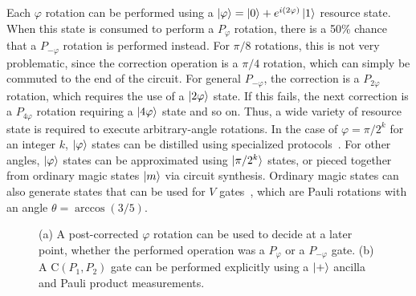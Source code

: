 \documentclass[prx,aps,letterpaper,twocolumn,allowfontchageintitle=true,accepted=2019-02-01]{quantumarticle}
\begin{document}
Each $\varphi$ rotation can be performed using a $\ket{\varphi} = \ket{0} + e^{i(2\varphi)}\ket{1}$ resource state. When this state is consumed to perform a $P_{\varphi}$ rotation, there is a 50\% chance that a $P_{-\varphi}$ rotation is performed instead. For $\pi/8$ rotations, this is not very problematic, since the correction operation is a $\pi/4$ rotation, which can simply be commuted to the end of the circuit. For general $P_{-\varphi}$, the correction is a $P_{2\varphi}$ rotation, which requires the use of a $\ket{2\varphi}$ state. If this fails, the next correction is a $P_{4\varphi}$ rotation requiring a $\ket{4\varphi}$ state and so on. Thus, a wide variety of resource state is required to execute arbitrary-angle rotations. In the case of $\varphi = \pi/2^k$ for an integer $k$, $\ket{\varphi}$ states can be distilled using specialized protocols~\cite{Duclos2015,Campbell2016a}. For other angles, $\ket{\varphi}$ states can be approximated using $\ket{\pi/2^k}$ states, or pieced together from ordinary magic states $\ket{m}$ via circuit synthesis. Ordinary magic states can also generate states that can be used for $V$ gates~\cite{Harrow2002,DuclosCianci2013,Bocharov2013}, which are Pauli rotations with an angle $\theta = \arccos(3/5)$.

\begin{figure}[t!]
\centering
\def\svgwidth{\linewidth}

\caption{(a) A post-corrected $\varphi$ rotation can be used to decide at a later point, whether the performed operation was a $P_{\varphi}$ or a $P_{-\varphi}$ gate. (b) A $\mathrm{C}(P_1,P_2)$ gate can be performed explicitly using a $\ket{+}$ ancilla and Pauli product measurements.}
\label{fig:phiconsumption}
\end{figure}
\end{document}
